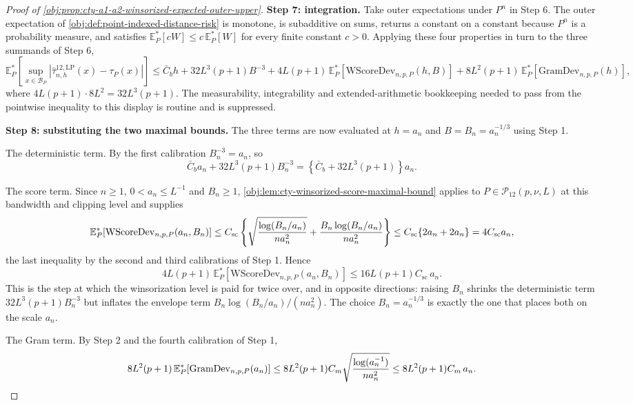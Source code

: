 \begin{proof}[Proof of \cref{obj:prop:cty-a1-a2-winsorized-expected-outer-upper}]
\textbf{Step 7: integration.}  Take outer expectations under \(P^n\) in Step 6.  The outer expectation of \cref{obj:def:point-indexed-distance-risk} is monotone, is subadditive on sums, returns a constant on a constant because \(P^n\) is a probability measure, and satisfies \(\mathbb E_P^*[cW]\leq c\,\mathbb E_P^*[W]\) for every finite constant \(c>0\).  Applying these four properties in turn to the three summands of Step 6,
\[
\mathbb E_P^*\!\left[\sup_{x\in\mathcal B_P}\left|\widehat\tau^{12,\mathrm{LP}}_{n,h}(x)-\tau_P(x)\right|\right]
\leq
\bar C_bh+32L^3(p+1)B^{-3}
+
4L(p+1)\,\mathbb E_P^*\!\left[\mathrm{WScoreDev}_{n,p,P}(h,B)\right]
+
8L^2(p+1)\,\mathbb E_P^*\!\left[\mathrm{GramDev}_{n,p,P}(h)\right] ,
\]
where \(4L(p+1)\cdot8L^2=32L^3(p+1)\).  The measurability, integrability and extended-arithmetic bookkeeping needed to pass from the pointwise inequality to this display is routine and is suppressed.

\textbf{Step 8: substituting the two maximal bounds.}  The three terms are now evaluated at \(h=a_n\) and \(B=B_n=a_n^{-1/3}\) using Step 1.

The deterministic term.  By the first calibration \(B_n^{-3}=a_n\), so
\[
\bar C_ba_n+32L^3(p+1)B_n^{-3}
=
\left\{\bar C_b+32L^3(p+1)\right\}a_n .
\]

The score term.  Since \(n\geq1\), \(0<a_n\leq L^{-1}\) and \(B_n\geq1\), \cref{obj:lem:cty-winsorized-score-maximal-bound} applies to \(P\in\mathcal P_{12}(p,\nu,L)\) at this bandwidth and clipping level and supplies
\[
\mathbb E_P^*\!\left[\mathrm{WScoreDev}_{n,p,P}(a_n,B_n)\right]
\leq
C_{\mathrm{sc}}\left\{
\sqrt{\log(B_n/a_n)\over na_n^2}
+
{B_n\log(B_n/a_n)\over na_n^2}
\right\}
\leq
C_{\mathrm{sc}}\{2a_n+2a_n\}
=
4C_{\mathrm{sc}}a_n ,
\]
the last inequality by the second and third calibrations of Step 1.  Hence
\[
4L(p+1)\,\mathbb E_P^*\!\left[\mathrm{WScoreDev}_{n,p,P}(a_n,B_n)\right]
\leq
16L(p+1)C_{\mathrm{sc}}\,a_n .
\]
This is the step at which the winsorization level is paid for twice over, and in opposite directions: raising \(B_n\) shrinks the deterministic term \(32L^3(p+1)B_n^{-3}\) but inflates the envelope term \(B_n\log(B_n/a_n)/(na_n^2)\).  The choice \(B_n=a_n^{-1/3}\) is exactly the one that places both on the scale \(a_n\).

The Gram term.  By Step 2 and the fourth calibration of Step 1,
\[
8L^2(p+1)\,\mathbb E_P^*\!\left[\mathrm{GramDev}_{n,p,P}(a_n)\right]
\leq
8L^2(p+1)C_m\sqrt{\log(a_n^{-1})\over na_n^2}
\leq
8L^2(p+1)C_m\,a_n .
\]


\end{proof}
